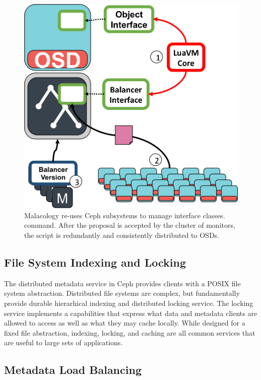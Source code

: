 \documentclass[10pt,twocolumn]{article}
\begin{document}
\begin{figure}[htbp]
\centering
\includegraphics{figures/implementation.png}
\caption{Malacology re-uses Ceph subsystems to manage interface classes.
command. After the proposal is accepted by the cluster of monitors, the
script is redundantly and consistently distributed to OSDs.
\label{fig:implementation}}
\end{figure}

\subsection{File System Indexing and Locking}

The distributed metadata service in Ceph provides clients with a POSIX file
system abstraction. Distributed file systems are complex, but fundamentally
provide durable hierarhical indexing and distributed locking service.  The
locking service implements a capabilities that express what data and metadata
clients are allowed to access as well as what they may cache locally.  While
designed for a fixed file abstraction, indexing, locking, and caching are all
common services that are useful to large sets of applications.

\subsection{Metadata Load Balancing}
\end{document}
